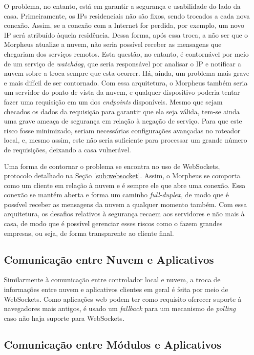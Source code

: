 O problema, no entanto, está em garantir a segurança e usabilidade do lado da casa. Primeiramente, os IPs residenciais não são fixos, sendo trocados a cada nova conexão. Assim, se a conexão com a Internet for perdida, por exemplo, um novo IP será atribuído àquela residência. Dessa forma, após essa troca, a não ser que o Morpheus atualize a nuvem, não seria possível receber as mensagens que chegariam dos serviços remotos. Esta questão, no entanto, é contornável por meio de um serviço de \emph{watchdog}, que seria responsável por analisar o IP e notificar a nuvem sobre a troca sempre que esta ocorrer. Há, ainda, um problema mais grave e mais difícil de ser contornado. Com essa arquitetura, o Morpheus também seria um servidor do ponto de vista da nuvem, e qualquer dispositivo poderia tentar fazer uma requisição em um dos \emph{endpoints} disponíveis. Mesmo que sejam checados os dados da requisição para garantir que ela seja válida, tem-se ainda uma grave ameaça de segurança em relação à negação de serviço. Para que este risco fosse minimizado, seriam necessárias configurações avançadas no roteador local, e, mesmo assim, este não seria suficiente para processar um grande número de requisições, deixando a casa vulnerável.

Uma forma de contornar o problema se encontra no uso de WebSockets, protocolo detalhado na Seção \ref{sub:websocket}. Assim, o Morpheus se comporta como um cliente em relação à nuvem e é sempre ele que abre uma conexão. Essa conexão se mantém aberta e forma um caminho \emph{full-duplex}, de modo que é possível receber as mensagens da nuvem a qualquer momento também. Com essa arquitetura, os desafios relativos à segurança recaem aos servidores e não mais à casa, de modo que é possível gerenciar esses riscos como o fazem grandes empresas, ou seja, de forma transparente ao cliente final.

\subsection{Comunicação entre Nuvem e Aplicativos}

Similarmente à comunicação entre controlador local e nuvem, a troca de informações entre nuvem e aplicativos clientes em geral é feita por meio de WebSockets. Como aplicações web podem ter como requisito oferecer suporte à navegadores mais antigos, é usado um \emph{fallback} para um mecanismo de \emph{polling} caso não haja suporte para WebSockets.

\subsection{Comunicação entre Módulos e Aplicativos}

